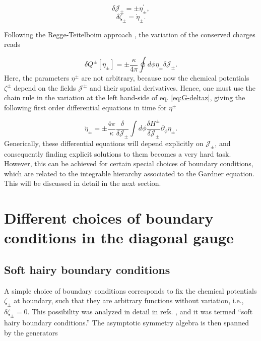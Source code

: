 \documentclass[letterpaper,11pt,oneside]{book}
\begin{document}
\begin{equation}
	\delta\mathcal{J_{\pm}}=\pm\eta_{\pm}^{\prime},\label{eq:G-deltaJ}
\end{equation}
\begin{equation}
	\delta\zeta_{\pm}=\dot{\eta}_{\pm}.\label{eq:G-deltaz}
\end{equation}

Following the Regge-Teitelboim approach \cite{Regge:1974zd}, the
variation of the conserved charges reads

\begin{equation}
	\delta Q^{\pm}\left[\eta_{\pm}\right]=\pm\frac{\kappa}{4\pi}\oint d\phi\eta_{\pm}\delta\mathcal{J_{\pm}}.\label{eq:G-deltaQ}
\end{equation}
Here, the parameters $\eta^{\pm}$ are not arbitrary, because now
the chemical potentials $\zeta^{\pm}$ depend on the fields $\mathcal{J}^{\pm}$
and their spatial derivatives. Hence, one must use the chain rule
in the variation at the left hand-side of eq. \eqref{eq:G-deltaz},
giving the following first order differential equations in time for
$\eta^{\pm}$

\begin{equation}
	\dot{\eta}_{\pm}=\pm\frac{4\pi}{\kappa}\frac{\delta}{\delta\mathcal{J_{\pm}}}\int d\phi\frac{\delta H^{\pm}}{\delta\mathcal{J_{\pm}}}\partial_{\phi}\eta_{\pm}.\label{eq:G-etapunto}
\end{equation}
Generically, these differential equations will depend explicitly on
$\mathcal{J_{\pm}}$, and consequently finding explicit solutions
to them becomes a very hard task. However, this can be achieved for
certain special choices of boundary conditions, which are related
to the integrable hierarchy associated to the Gardner equation. This
will be discussed in detail in the next section.

\section{Different choices of boundary conditions in the diagonal gauge\label{sec:G-Different-choices-of}}

\subsection{Soft hairy boundary conditions\label{sec:G-softhairy}}

A simple choice of boundary conditions corresponds to fix the chemical
potentials $\zeta_{\pm}$ at boundary, such that they are arbitrary
functions without variation, i.e., $\delta\zeta_{\pm}=0$. This possibility
was analyzed in detail in refs. \cite{Afshar:2016wfy,Afshar:2016kjj},
and it was termed ``soft hairy boundary conditions.'' The asymptotic
symmetry algebra is then spanned by the generators
\end{document}
